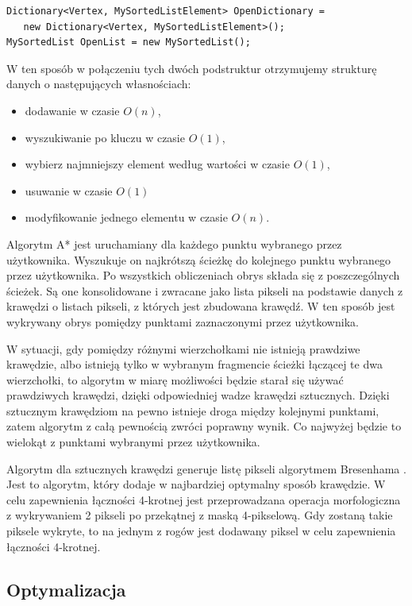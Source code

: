 \documentclass[a4paper,11pt,twoside,openright]{report}
\theoremstyle{definition}
\begin{document}
\begin{verbatim}
Dictionary<Vertex, MySortedListElement> OpenDictionary =
   new Dictionary<Vertex, MySortedListElement>();
MySortedList OpenList = new MySortedList();
\end{verbatim}

W ten sposób w połączeniu tych dwóch podstruktur otrzymujemy strukturę danych o następujących własnościach:
\begin{itemize}[noitemsep]
\item dodawanie w czasie $O(n)$,
\item wyszukiwanie po kluczu w czasie $O(1)$,
\item wybierz najmniejszy element według wartości w czasie $O(1)$,
\item usuwanie w czasie $O(1)$
\item modyfikowanie jednego elementu w czasie $O(n)$.
\end{itemize}

Algorytm A* jest uruchamiany dla każdego punktu wybranego przez użytkownika. Wyszukuje on najkrótszą ścieżkę do kolejnego punktu wybranego przez użytkownika. Po wszystkich obliczeniach obrys składa się z poszczególnych ścieżek. Są one konsolidowane i zwracane jako lista pikseli na podstawie danych z krawędzi o listach pikseli, z których jest zbudowana krawędź. W ten sposób jest wykrywany obrys pomiędzy punktami zaznaczonymi przez użytkownika.

W sytuacji, gdy pomiędzy różnymi wierzchołkami nie istnieją prawdziwe krawędzie, albo istnieją tylko w wybranym fragmencie ścieżki łączącej te dwa wierzchołki, to algorytm w miarę możliwości będzie starał się używać prawdziwych krawędzi, dzięki odpowiedniej wadze krawędzi sztucznych. Dzięki sztucznym krawędziom na pewno istnieje droga między kolejnymi punktami, zatem algorytm z całą pewnością zwróci poprawny wynik. Co najwyżej będzie to wielokąt z punktami wybranymi przez użytkownika.

Algorytm dla sztucznych krawędzi generuje listę pikseli algorytmem Bresenhama \cite{Bresenham}. Jest to algorytm, który dodaje w najbardziej optymalny sposób krawędzie. W celu zapewnienia łączności 4-krotnej jest przeprowadzana operacja morfologiczna z wykrywaniem 2 pikseli po przekątnej z maską 4-pikselową. Gdy zostaną takie piksele wykryte, to na jednym z rogów jest dodawany piksel w celu zapewnienia łączności 4-krotnej.

\subsection {Optymalizacja}
\end{document}
